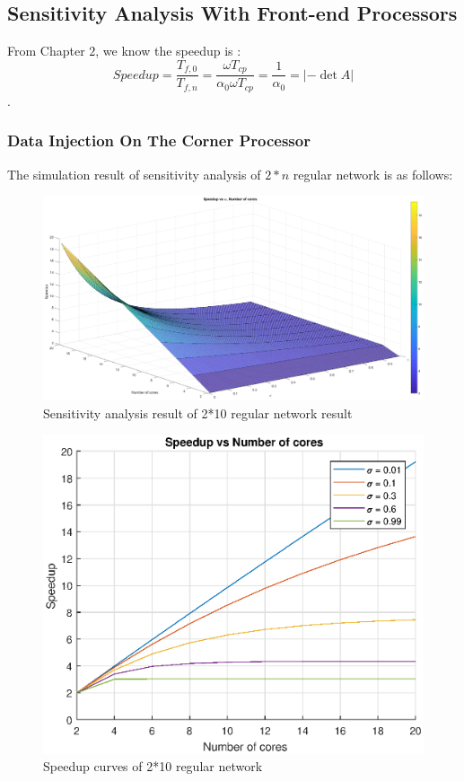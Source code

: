 \subsection{Sensitivity Analysis With Front-end Processors}
From Chapter $2$, we know the speedup is :
$$Speedup = \frac{T_{f, 0}}{T_{f, n}}= \frac{\omega T_{cp}}{\alpha_{0}\omega T_{cp}} = \frac{1}{\alpha_{0}} = \left |-\det A \right |$$.
\subsubsection{Data Injection On The Corner Processor}
The simulation result of sensitivity analysis of $2*n$ regular network  is as follows:
\begin{figure}[!ht]
\centering
\includegraphics[width=1\columnwidth]{figure/sa2t10c.eps}
\caption{Sensitivity analysis result of 2*10 regular network result}
\label{fig:sa2t10c}
\end{figure}

\begin{figure}[!ht]
\centering
\includegraphics[width=1\columnwidth]{figure/sa2t10c_curve.eps}
\caption{Speedup curves of 2*10 regular network}
\label{fig:sa2t10c_curve}
\end{figure}

